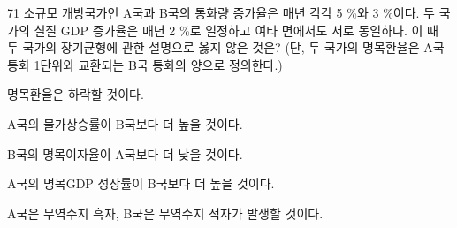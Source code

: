 \begin{question}{71}
소규모 개방국가인 A국과 B국의 통화량 증가율은 매년 각각 5 \%와 3 \%이다. 두 국가의 실질 GDP 증가율은 매년 2 \%로 일정하고 여타 면에서도 서로 동일하다. 이 때 두 국가의 장기균형에 관한 설명으로 옳지 않은 것은? (단, 두 국가의 명목환율은 A국 통화 1단위와 교환되는 B국 통화의 양으로 정의한다.)
\begin{choices}
  \item 명목환율은 하락할 것이다.
  \item A국의 물가상승률이 B국보다 더 높을 것이다.
  \item B국의 명목이자율이 A국보다 더 낮을 것이다.
  \item A국의 명목GDP 성장률이 B국보다 더 높을 것이다.
  \item A국은 무역수지 흑자, B국은 무역수지 적자가 발생할 것이다.
\end{choices}
\end{question}
